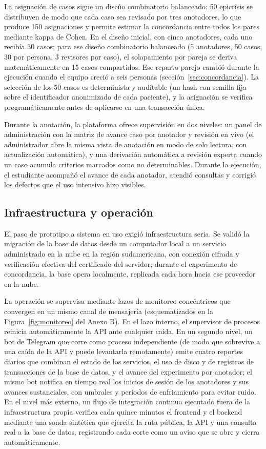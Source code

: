 \documentclass[12pt,letterpaper]{article}
\begin{document}
La asignación de casos sigue un diseño combinatorio balanceado: 50 epicrisis se distribuyen de modo que cada caso sea revisado por tres anotadores, lo que produce 150 asignaciones y permite estimar la concordancia entre todos los pares mediante kappa de Cohen. En el diseño inicial, con cinco anotadores, cada uno recibía 30 casos; para ese diseño combinatorio balanceado (5 anotadores, 50 casos, 30 por persona, 3 revisores por caso), el solapamiento por pareja se deriva matemáticamente en 15 casos compartidos. Ese reparto parejo cambió durante la ejecución cuando el equipo creció a seis personas (sección~\ref{sec:concordancia}). La selección de los 50 casos es determinista y auditable (un hash con semilla fija sobre el identificador anonimizado de cada paciente), y la asignación se verifica programáticamente antes de aplicarse en una transacción única.

Durante la anotación, la plataforma ofrece supervisión en dos niveles: un panel de administración con la matriz de avance caso por anotador y revisión en vivo (el administrador abre la misma vista de anotación en modo de solo lectura, con actualización automática), y una derivación automática a revisión experta cuando un caso acumula criterios marcados como no determinables. Durante la ejecución, el estudiante acompañó el avance de cada anotador, atendió consultas y corrigió los defectos que el uso intensivo hizo visibles.

\subsection{Infraestructura y operación}

El paso de prototipo a sistema en uso exigió infraestructura seria. Se validó la migración de la base de datos desde un computador local a un servicio administrado en la nube en la región sudamericana, con conexión cifrada y verificación efectiva del certificado del servidor; durante el experimento de concordancia, la base opera localmente, replicada cada hora hacia ese proveedor en la nube.

La operación se supervisa mediante lazos de monitoreo concéntricos que convergen en un mismo canal de mensajería (esquematizados en la Figura~\ref{fig:monitoreo} del Anexo B). En el lazo interno, el supervisor de procesos reinicia automáticamente la API ante cualquier caída. En un segundo nivel, un bot de Telegram que corre como proceso independiente (de modo que sobrevive a una caída de la API y puede levantarla remotamente) emite cuatro reportes diarios que combinan el estado de los servicios, el uso de disco y de registros de transacciones de la base de datos, y el avance del experimento por anotador; el mismo bot notifica en tiempo real los inicios de sesión de los anotadores y sus avances sustanciales, con umbrales y períodos de enfriamiento para evitar ruido. En el nivel más externo, un flujo de integración continua ejecutado fuera de la infraestructura propia verifica cada quince minutos el frontend y el backend mediante una sonda sintética que ejercita la ruta pública, la API y una consulta real a la base de datos, registrando cada corte como un aviso que se abre y cierra automáticamente.
\end{document}
